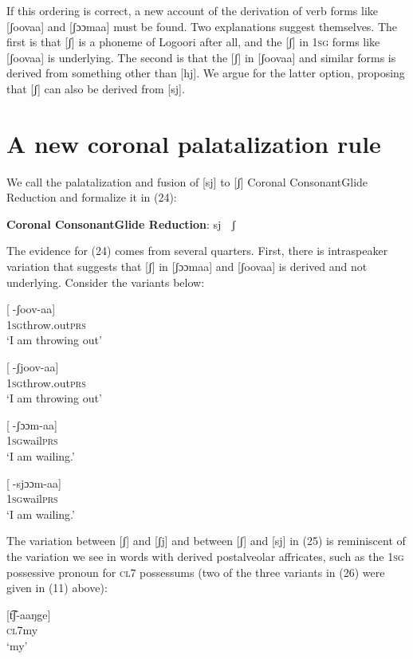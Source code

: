 \documentclass[output=paper]{langsci/langscibook}
\begin{document}
If this ordering is correct, a new account of the derivation of verb forms like [ʃoovaa] and [ʃɔɔmaa] must be found. Two explanations suggest themselves. The first is that [ʃ] is a phoneme of Logoori after all, and the [ʃ] in 1\textsc{sg} forms like [ʃoovaa] is underlying. The second is that the [ʃ] in [ʃoovaa] and similar forms is derived from something other than [hj]. We argue for the latter option, proposing that [ʃ] can also be derived from [sj].

\section{A new coronal palatalization rule}

We call the palatalization and fusion of [sj] to [ʃ] Coronal ConsonantGlide Reduction and formalize it in (24):


 

\ea{}
 \textbf{Coronal ConsonantGlide Reduction}: sj  ʃ\\{}
\z



The evidence for (24) comes from several quarters. First, there is intraspeaker variation that suggests that [ʃ] in [ʃɔɔmaa] and [ʃoovaa] is derived and not underlying. Consider the variants below:
 
\ea{}
 [-ʃoov-aa]\\{}
\textsc{1sg}throw.out\textsc{prs}\\{}
\glt ‘I am throwing out’
\z


\ea{}
 [-ʃjoov-aa]\\{}
\textsc{1sg}throw.out\textsc{prs}\\{}
\glt ‘I am throwing out’
\z

\ea{}
 [-ʃɔɔm-aa]\\{}
\textsc{1sg}wail\textsc{prs}\\{}
\textsc{‘I} am wailing.’
\z

\ea{}
 [-sjɔɔm-aa]\\{}
\textsc{1sg}wail\textsc{prs}\\{}
\glt ‘I am wailing.’
\z

The variation between [ʃ] and [ʃj] and between [ʃ] and [sj] in (25) is reminiscent of the variation we see in words with derived postalveolar affricates, such as the 1\textsc{sg} possessive pronoun for \textsc{cl}7 possessums (two of the three variants in (26) were given in (11) above):

\ea{}
 [t͡ʃ-aaŋge]\\{}
\textsc{cl7}my\\{}
\glt ‘my’
\z
\end{document}
